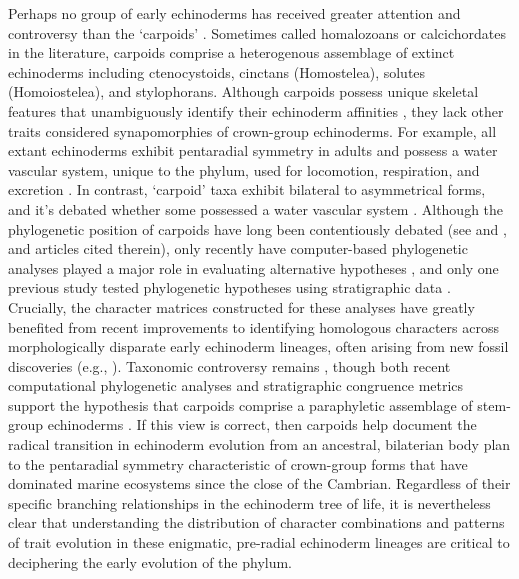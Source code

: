\documentclass{article}
\begin{document}
Perhaps no group of early echinoderms has received greater attention and controversy than the `carpoids’ \citep{RahmanMakingSenseofCarpoids2009}. Sometimes called homalozoans or calcichordates in the literature, carpoids comprise a heterogenous assemblage of extinct echinoderms including ctenocystoids, cinctans (Homostelea), solutes (Homoiostelea), and stylophorans. Although carpoids possess unique skeletal features that unambiguously identify their echinoderm affinities \citep{DavidEtAl2000, Bottjer2006, RahmanMakingSenseofCarpoids2009, ZamoraEtAl2020}, they lack other traits considered synapomorphies of crown-group echinoderms. For example, all extant echinoderms exhibit pentaradial symmetry in adults and possess a water vascular system, unique to the phylum, used for locomotion, respiration, and excretion \citep{Nichols1972}.  In contrast, ‘carpoid’ taxa exhibit bilateral to asymmetrical forms, and it’s debated whether some possessed a water vascular system \citep{Smith2005, LefebvreEtAl2019}. Although the phylogenetic position of carpoids have long been contentiously debated (see \citealp{RahmanMakingSenseofCarpoids2009} and \citealp{Rahman2009b}, and articles cited therein), only recently have computer-based phylogenetic analyses played a major role in evaluating alternative hypotheses \citep{Sumrall1997, SmithAndZamora2013, ZamoraRahman2014}, and only one previous study tested phylogenetic hypotheses using stratigraphic data \citep{Rahman2009b}. Crucially, the character matrices constructed for these analyses have greatly benefited from recent improvements to identifying homologous characters across morphologically disparate early echinoderm lineages, often arising from new fossil discoveries (e.g., \citealp{ZamoraEtAl2012, SmithAndZamora2013}). Taxonomic controversy remains \citep{DavidEtAl2000}, though both recent computational phylogenetic analyses and stratigraphic congruence metrics support the hypothesis that carpoids comprise a paraphyletic assemblage of stem-group echinoderms \citep{Rahman2009b, SmithAndZamora2013, ZamoraRahman2014}. If this view is correct, then carpoids help document the radical transition in echinoderm evolution from an ancestral, bilaterian body plan to the pentaradial symmetry characteristic of crown-group forms that have dominated marine ecosystems since the close of the Cambrian. Regardless of their specific branching relationships in the echinoderm tree of life, it is nevertheless clear that understanding the distribution of character combinations and patterns of trait evolution in these enigmatic, pre-radial echinoderm lineages are critical to deciphering the early evolution of the phylum.
\end{document}
